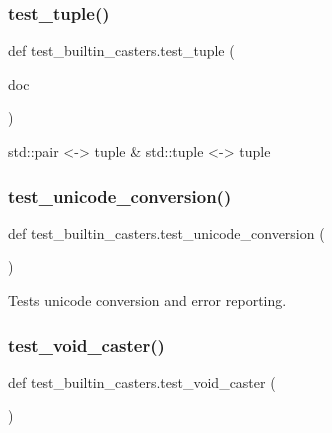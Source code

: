 \subsubsection{\texorpdfstring{test\_tuple()}{test\_tuple()}}
{\footnotesize\ttfamily def test\+\_\+builtin\+\_\+casters.\+test\+\_\+tuple (\begin{DoxyParamCaption}\item[{}]{doc }\end{DoxyParamCaption})}

\begin{DoxyVerb}std::pair <-> tuple & std::tuple <-> tuple\end{DoxyVerb}
 \mbox{\label{namespacetest__builtin__casters_aced76e5b786549b7843b689949a5bd24}} 
\subsubsection{\texorpdfstring{test\_unicode\_conversion()}{test\_unicode\_conversion()}}
{\footnotesize\ttfamily def test\+\_\+builtin\+\_\+casters.\+test\+\_\+unicode\+\_\+conversion (\begin{DoxyParamCaption}{ }\end{DoxyParamCaption})}

\begin{DoxyVerb}Tests unicode conversion and error reporting.\end{DoxyVerb}
 \mbox{\label{namespacetest__builtin__casters_a63c920b715170a4c06f357e3c8c704c2}} 
\subsubsection{\texorpdfstring{test\_void\_caster()}{test\_void\_caster()}}
{\footnotesize\ttfamily def test\+\_\+builtin\+\_\+casters.\+test\+\_\+void\+\_\+caster (\begin{DoxyParamCaption}{ }\end{DoxyParamCaption})}

\mbox{\label{namespacetest__builtin__casters_ac170b407d9858995314cc52aa8d38de3}} 
